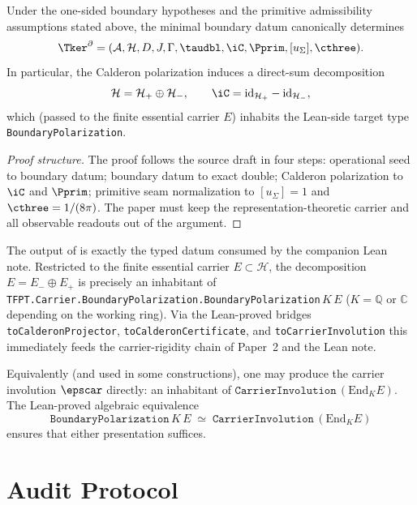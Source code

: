 \begin{theorem}
\label{thm:primitive-boundary-kernel}
Under the one-sided boundary hypotheses and the primitive admissibility assumptions stated above,
the minimal boundary datum canonically determines
\[
\Tker^\partial
=
(\mathcal A,\mathcal H,D,J,\Gamma,\taudbl,\iC,\Pprim,[u_\Sigma],\cthree).
\]
In particular, the Calderon polarization induces a direct-sum decomposition
\[
\mathcal H = \mathcal H_+ \oplus \mathcal H_-,
\qquad
\iC = \mathrm{id}_{\mathcal H_+} - \mathrm{id}_{\mathcal H_-},
\]
which (passed to the finite essential carrier $E$) inhabits the Lean-side target type
\texttt{BoundaryPolarization}.
\end{theorem}

\begin{proof}[Proof structure]
The proof follows the source draft in four steps: operational seed to boundary datum; boundary
datum to exact double; Calderon polarization to $\iC$ and $\Pprim$; primitive seam normalization to
$[u_\Sigma]=1$ and $\cthree=1/(8\pi)$. The paper must keep the representation-theoretic carrier
and all observable readouts out of the argument.
\end{proof}

\begin{remark}
\label{rem:lean-target-paper1}
The output of  is exactly the typed datum consumed by the
companion Lean note. Restricted to the finite essential carrier $E \subset \mathcal H$, the
decomposition $E = E_- \oplus E_+$ is precisely an inhabitant of
\texttt{TFPT.Carrier.BoundaryPolarization.BoundaryPolarization}$\,K\,E$
($K = \mathbb Q$ or $\mathbb C$ depending on the working ring). Via the Lean-proved bridges
\texttt{toCalderonProjector}, \texttt{toCalderonCertificate}, and
\texttt{toCarrierInvolution} this immediately feeds the carrier-rigidity chain
of Paper~2 and the Lean note.

Equivalently (and used in some constructions), one may produce the carrier involution
$\epscar$ directly: an inhabitant of $\texttt{CarrierInvolution}\,(\mathrm{End}_K E)$. The Lean-proved
algebraic equivalence
\[
\texttt{BoundaryPolarization}\,K\,E
\;\simeq\;
\texttt{CarrierInvolution}\,(\mathrm{End}_K E)
\]
ensures that either presentation suffices.
\end{remark}

\section{Audit Protocol}

